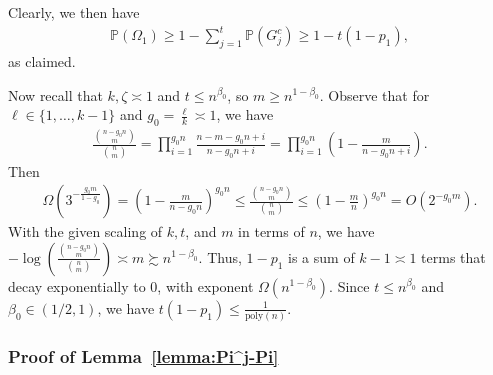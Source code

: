 \documentclass{article}
\newcommand{\mprob}{\mathbb{P}}
\newcommand{\E}{\mathbb{E}}
\begin{document}
Clearly, we then have 
\begin{align*}
\mathbb{P}(\Omega_1) \geq 1 - \sum_{j = 1}^t\mathbb{P}(G_j^c) \geq 1 - t(1 - p_1),
\end{align*}
as claimed. 

Now recall that $k, \zeta \asymp 1$ and $t \leq n^{\beta_0}$, so $m \geq n^{1 - \beta_0}$. Observe that for $\ell \in \{1, \dots, k - 1\}$ and $g_0 = \frac{\ell}{k} \asymp 1$, we have
\begin{align*}
\frac{\binom{n - g_0n}{m}}{\binom{n}{m}} = \prod_{i = 1}^{g_0n}\frac{n - m - g_0n + i}{n - g_0n + i} = \prod_{i = 1}^{g_0n}\left(1 - \frac{m}{n - g_0n + i}\right).
\end{align*}
Then 
\begin{align*}
\Omega\left(3^{-\frac{g_0m}{1 - g_0}}\right) = \left(1 - \frac{m}{n - g_0n}\right)^{g_0n} \leq \frac{\binom{n - g_0n}{m}}{\binom{n}{m}} \leq \left(1 - \frac{m}{n}\right)^{g_0n} = O\left(2^{-g_0m}\right).
\end{align*}
With the given scaling of $k, t$, and $m$ in terms of $n$, we have $-\log\left(\frac{\binom{n - g_0n}{m}}{\binom{n}{m}}\right) \asymp m \succsim n^{1 - \beta_0}$. Thus, $1 - p_1$ is a sum of $k - 1 \asymp 1$ terms that decay exponentially to $0$, with exponent $\Omega(n^{1 - \beta_0})$. Since $t \leq n^{\beta_0}$ and $\beta_0 \in (1/2, 1)$, we have $t(1 - p_1) \leq \frac{1}{\mathrm{poly}(n)}$.


\subsubsection{Proof of Lemma~\ref{lemma:Pi^j-Pi}}
\label{AppLemPij}
\end{document}
